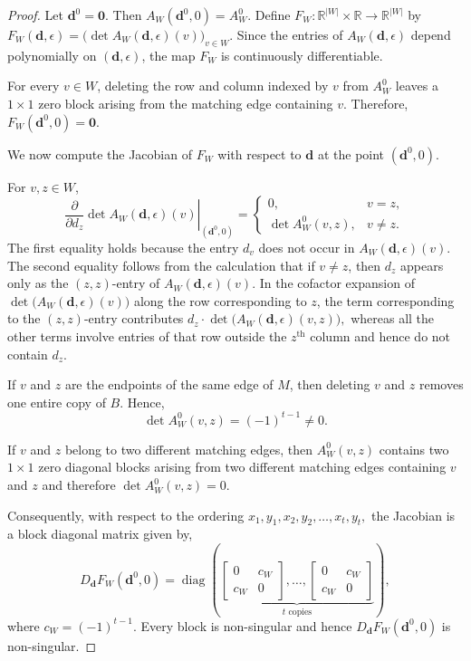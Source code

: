 \documentclass[12pt,reqno]{amsart}
\theoremstyle{plain}
\theoremstyle{definition}
\theoremstyle{block}
\theoremstyle{remark}
\numberwithin{equation}{section}
\begin{document}
\begin{proof}
Let \(\mathbf d^0=\mathbf 0\). Then
\(
A_W(\mathbf d^0,0)=A_W^0.
\)
Define
\(
F_W:\mathbb R^{|W|}\times\mathbb R
\longrightarrow
\mathbb R^{|W|}
\)
by
\(
F_W(\mathbf d,\epsilon)
=
\bigl(
\det A_W(\mathbf d,\epsilon)(v)
\bigr)_{v\in W}.
\)
Since the entries of \(A_W(\mathbf d,\epsilon)\) depend polynomially
on \((\mathbf d,\epsilon)\), the map \(F_W\) is continuously
differentiable.

For every \(v\in W\), deleting the row and column indexed by \(v\)
from \(A_W^0\) leaves a \(1\times1\) zero block arising from the
matching edge containing \(v\). Therefore,
\(
F_W(\mathbf d^0,0)=\mathbf 0.
\)

We now compute the Jacobian of \(F_W\) with respect to \(\mathbf d\) at the point \((\mathbf{d}^0,0)\).

For \(v,z\in W\),
\[
\left.
\frac{\partial}{\partial d_z}
\det A_W(\mathbf d,\epsilon)(v)
\right|_{(\mathbf d^0,0)}
=
\begin{cases}
0, & v=z,\\[1mm]
\det A_W^0(v,z), & v\neq z.
\end{cases}
\]
The first equality holds because the entry \(d_v\) does not occur in
\(A_W(\mathbf d,\epsilon)(v)\). 
The second equality follows from the calculation that if \(v\neq z\), then \(d_z\) appears only as the \((z,z)\)-entry of
\(A_W(\mathbf{d},\epsilon)(v)\). In the cofactor expansion of
\(\det\bigl(A_W(\mathbf{d},\epsilon)(v)\bigr)\) along the row corresponding to \(z\), the term
corresponding to the \((z,z)\)-entry contributes
\(
d_z\cdot\det\bigl(A_W(\mathbf{d},\epsilon)(v,z)\bigr),
\)
whereas all the other terms involve entries of that row outside the
\(z^{\text{th}}\) column and hence do not contain \(d_z\).

If \(v\) and \(z\) are the endpoints of the same edge of \(M\), then
deleting \(v\) and \(z\) removes one entire copy of \(B\). Hence,
\[
\det A_W^0(v,z)=(-1)^{t-1}\neq0.
\]

If \(v\) and \(z\) belong to two different matching edges, then
\(A_W^0(v,z)\) contains two \(1\times1\) zero diagonal blocks arising from two different matching edges containing $v$ and $z$  and
therefore
\(
\det A_W^0(v,z)=0.
\)

Consequently, with respect to the ordering
\(
x_1,y_1,x_2,y_2,\ldots,x_t,y_t,
\)
the Jacobian is a block diagonal matrix given by,
\[
D_{\mathbf d}F_W(\mathbf d^0,0)
=
\operatorname{diag}
\left(
\underbrace{
\begin{bmatrix}
0&c_W\\
c_W&0
\end{bmatrix},
\ldots,
\begin{bmatrix}
0&c_W\\
c_W&0
\end{bmatrix}
}_{t\text{ copies}}
\right),
\]
where
\(
c_W=(-1)^{t-1}.
\)
Every block is non-singular and hence
\(
D_{\mathbf d}F_W(\mathbf d^0,0)
\)
is non-singular.


\end{proof}
\end{document}
